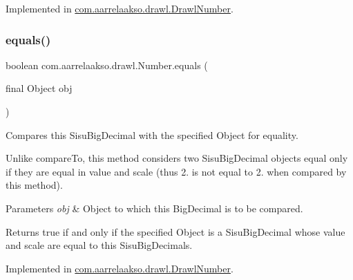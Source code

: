 Implemented in \hyperlink{classcom_1_1aarrelaakso_1_1drawl_1_1_drawl_number_a09dfa96894d84cc9734e41bf4a88ae3b}{com.\+aarrelaakso.\+drawl.\+Drawl\+Number}.

\mbox{\label{interfacecom_1_1aarrelaakso_1_1drawl_1_1_number_a9cf883b0a5979a9f0420cca2c2ff9d89}} 
\subsubsection{\texorpdfstring{equals()}{equals()}\hspace{0.1cm}{\footnotesize\ttfamily [3/3]}}
{\footnotesize\ttfamily boolean com.\+aarrelaakso.\+drawl.\+Number.\+equals (\begin{DoxyParamCaption}\item[{final Object}]{obj }\end{DoxyParamCaption})}



Compares this Sisu\+Big\+Decimal with the specified Object for equality. 

Unlike compare\+To, this method considers two Sisu\+Big\+Decimal objects equal only if they are equal in value and scale (thus 2. is not equal to 2. when compared by this method).


\begin{DoxyParams}{Parameters}
{\em obj} & Object to which this Big\+Decimal is to be compared. \\
\hline
\end{DoxyParams}
\begin{DoxyReturn}{Returns}
true if and only if the specified Object is a Sisu\+Big\+Decimal whose value and scale are equal to this Sisu\+Big\+Decimal\textquotesingle{}s. 
\end{DoxyReturn}


Implemented in \hyperlink{classcom_1_1aarrelaakso_1_1drawl_1_1_drawl_number_a54d65831347b02b14569ddfc021a4ade}{com.\+aarrelaakso.\+drawl.\+Drawl\+Number}.

\mbox{\label{interfacecom_1_1aarrelaakso_1_1drawl_1_1_number_ad6df5caf5478cc3f85cc808cf39a0610}} 
